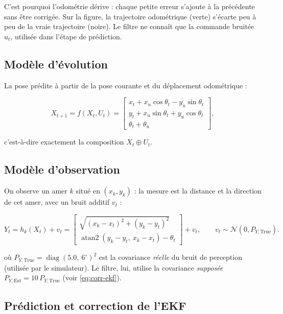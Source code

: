 \documentclass[11pt]{article}
\theoremstyle{remark}
\theoremstyle{definition}
\begin{document}
C'est pourquoi l'odom\'etrie d\'erive : chaque petite erreur s'ajoute \`a la pr\'ec\'edente sans
\^etre corrig\'ee. Sur la figure, la trajectoire odom\'etrique (verte) s'\'ecarte peu \`a peu de la
vraie trajectoire (noire). Le filtre ne conna\^it que la commande bruit\'ee $u_t$, utilis\'ee dans
l'\'etape de pr\'ediction.

\subsection{Mod\`ele d'\'evolution}

La pose pr\'edite \`a partir de la pose courante et du d\'eplacement odom\'etrique :

\begin{equation}
X_{t+1} = f(X_t, U_t) =
\begin{bmatrix}
x_t + x_u \cos\theta_t - y_u \sin\theta_t \\[2pt]
y_t + x_u \sin\theta_t + y_u \cos\theta_t \\[2pt]
\theta_t + \theta_u
\end{bmatrix},
\label{eq:f-model}
\end{equation}

c'est-\`a-dire exactement la composition $X_t \oplus U_t$.

\subsection{Mod\`ele d'observation}

On observe un amer $k$ situ\'e en $(x_k, y_k)$ : la mesure est la distance et la direction de cet
amer, avec un bruit additif $v_t$ :

\begin{equation}
Y_t = h_k(X_t) + v_t =
\begin{bmatrix}
\sqrt{(x_k-x_t)^2 + (y_k-y_t)^2} \\[4pt]
\operatorname{atan2}(y_k-y_t,\ x_k-x_t) - \theta_t
\end{bmatrix} + v_t,
\qquad
v_t \sim \mathcal{N}(0, P_{Y,\text{True}}).
\label{eq:obs-q2}
\end{equation}

o\`u $P_{Y,\text{True}} = \operatorname{diag}(5.0,\ 6^\circ)^2$ est la covariance \emph{r\'eelle} du
bruit de perception (utilis\'ee par le simulateur). Le filtre, lui, utilise la covariance
\emph{suppos\'ee} $P_{Y,\text{Est}} = 10\,P_{Y,\text{True}}$ (voir \eqref{eq:corr-ekf}).

\subsection{Pr\'ediction et correction de l'EKF}
\end{document}
